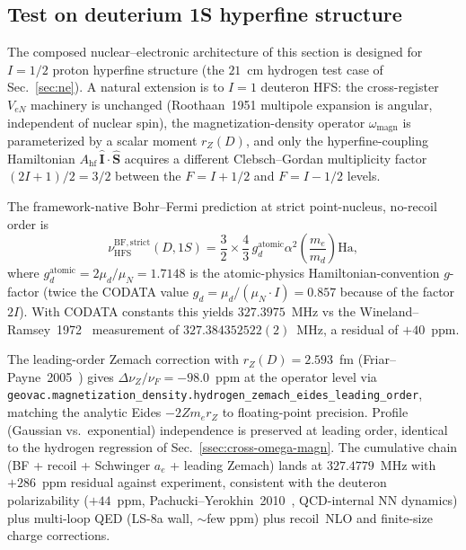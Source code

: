 \documentclass[twocolumn,prc,amsmath,amssymb,superscriptaddress]{revtex4-2}
\begin{document}
\subsection{Test on deuterium 1S hyperfine structure}
\label{ssec:cross-deuterium-hfs}

The composed nuclear--electronic architecture of this section is
designed for $I=1/2$ proton hyperfine structure (the $21$~cm hydrogen
test case of Sec.~\ref{sec:ne}). A natural extension is to $I=1$
deuteron HFS: the cross-register $V_{eN}$ machinery is unchanged
(Roothaan~1951 multipole expansion is angular, independent of nuclear
spin), the magnetization-density operator $\omega_{\mathrm{magn}}$ is
parameterized by a scalar moment $r_Z(D)$, and only the
hyperfine-coupling Hamiltonian $A_\text{hf}\,\hat{\mathbf{I}}\cdot
\hat{\mathbf{S}}$ acquires a different Clebsch--Gordan multiplicity
factor $(2I+1)/2 = 3/2$ between the $F = I + 1/2$ and $F = I - 1/2$
levels.

The framework-native Bohr--Fermi prediction at strict point-nucleus,
no-recoil order is
\begin{equation}
  \nu_{\mathrm{HFS}}^{\mathrm{BF,strict}}(D, 1S)
  = \frac{3}{2} \times \frac{4}{3}\, g_d^{\mathrm{atomic}} \alpha^2
    \left(\frac{m_e}{m_d}\right) \mathrm{Ha},
\label{eq:d-hfs-bf}
\end{equation}
where $g_d^{\mathrm{atomic}} = 2 \mu_d/\mu_N = 1.7148$ is the
atomic-physics Hamiltonian-convention $g$-factor (twice the
CODATA value $g_d = \mu_d/(\mu_N \cdot I) = 0.857$ because of the
factor $2I$). With CODATA constants this yields $327.3975$~MHz vs the
Wineland--Ramsey~1972~\cite{WinelandRamsey1972} measurement of
$327.384352522(2)$~MHz, a residual of $+40$~ppm.

The leading-order Zemach correction with $r_Z(D) = 2.593$~fm
(Friar--Payne~2005~\cite{FriarPayne2005}) gives
$\Delta\nu_Z/\nu_F = -98.0$~ppm at the operator level via
\texttt{geovac.magnetization\_density.hydrogen\_zemach\_eides\_leading\_order},
matching the analytic Eides $-2 Z m_e r_Z$ to floating-point precision.
Profile (Gaussian vs.\ exponential) independence is preserved at
leading order, identical to the hydrogen regression of
Sec.~\ref{ssec:cross-omega-magn}. The cumulative chain
(BF + recoil + Schwinger $a_e$ + leading Zemach) lands at $327.4779$~MHz
with $+286$~ppm residual against experiment, consistent with the
deuteron polarizability ($+44$~ppm,
Pachucki--Yerokhin~2010~\cite{PachuckiYerokhin2010}, QCD-internal NN
dynamics) plus multi-loop QED (LS-8a wall, $\sim$few ppm) plus
recoil~NLO and finite-size charge corrections.
\end{document}
